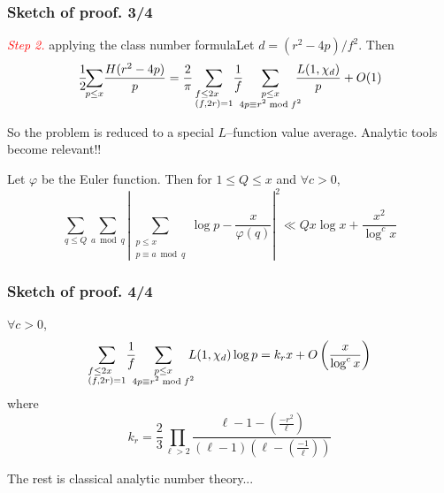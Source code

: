 \documentclass[10pt,handout]{beamer} %
\theoremstyle{definition}
\begin{document}
\begin{frame}
\frametitle{Sketch of proof. 3/4}

 \begin{block}
 {\textcolor{red}{\textit{Step 2.}} applying the class number formula}\pause Let $d=(r^2-4p)/f^2$. Then \pause
$$\frac12\!\!\sum_{p\leq x}
\!\frac{H(r^2-4p)}{p}=\frac2\pi\sum_{\begin{subarray}{l} f\leq 2x\\ (f,2r)=1\end{subarray}}\!\frac 1f\!\!\!
\sum_{\begin{subarray}{c}p\leq x\\
4p\equiv r^2\bmod f^2
\end{subarray}}\!\!\!\!\frac{L(1,\chi_{d})}{p}+O(1)$$
 \end{block}\pause

 So the problem is reduced to a special $L$--function value average. \pause Analytic tools become relevant!!\pause

\begin{theorem}\pause
Let $\varphi$ be the Euler function. Then for $1 \leq Q \leq x$ and $\forall c>0$,\pause
$$\sum_{q \leq Q} \sum_{a \bmod q } \left|\sum_{\substack{p\leq x \\ p \equiv a \bmod q}} \log p - \frac{x}{\varphi(q)}\right|^2
\ll Q x \log x + \frac{x^2}{ \log^c x}$$
\end{theorem}\pause
\end{frame}

\begin{frame}
\frametitle{Sketch of proof. 4/4}

\begin{lemma}\pause
$\forall c>0$,\pause
$$
\sum_{\begin{subarray}{l} f\leq 2x\\ (f,2r)=1\end{subarray}}\!\frac 1f\!\!\!\sum_{\begin{subarray}{c}p\leq x\\
4p\equiv r^2\bmod f^2
\end{subarray}}\!\!\!\!L(1,\chi_{d})\log p=k_rx+O\left(\frac{x}{\log^cx}\right)$$
where 
$$k_{r}=\frac23
\prod_{\ell>2}\frac{\ell-1-\left(\frac{-r^2}{\ell}\right)}{(\ell-1)(\ell-\left(\frac{-1}{\ell}\right))}$$
 \end{lemma}\pause
 
 The rest is classical analytic number theory...

 \end{frame}
\end{document}
